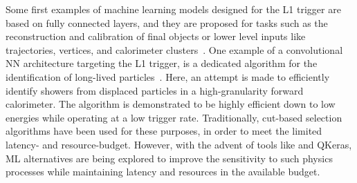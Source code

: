 Some first examples of machine learning models designed for the L1 trigger are based on fully connected layers, and they are proposed for tasks such as the reconstruction and calibration of final objects or lower level inputs like trajectories, vertices, and calorimeter clusters~\cite{CERN-LHCC-2020-004}. 
One example of a convolutional NN architecture targeting the L1 trigger, is a dedicated algorithm for the identification of long-lived particles~\cite{Alimena_2020}. Here, an attempt is made to efficiently identify showers from displaced particles in a high-granularity forward calorimeter. The algorithm is demonstrated to be highly efficient down to low energies while operating at a low trigger rate.
Traditionally, cut-based selection algorithms have been used for these purposes, in order to meet the limited latency- and resource-budget. However, with the advent of tools like \hlsfml and QKeras, ML alternatives are being explored to improve the sensitivity to such physics processes while maintaining latency and resources in the available budget.


